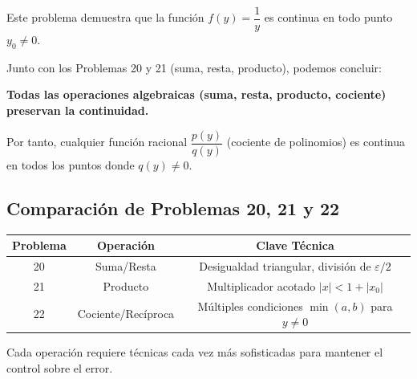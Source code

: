 Este problema demuestra que la función $f(y) = \dfrac{1}{y}$ es continua en todo punto $y_0 \neq 0$. 

Junto con los Problemas 20 y 21 (suma, resta, producto), podemos concluir:

\textbf{Todas las operaciones algebraicas (suma, resta, producto, cociente) preservan la continuidad.}

Por tanto, cualquier función racional $\dfrac{p(y)}{q(y)}$ (cociente de polinomios) es continua en todos los puntos donde $q(y) \neq 0$.

\subsection*{Comparación de Problemas 20, 21 y 22}

\begin{center}
\begin{tabular}{|c|c|c|}
\hline
\textbf{Problema} & \textbf{Operación} & \textbf{Clave Técnica} \\
\hline
20 & Suma/Resta & Desigualdad triangular, división de $\varepsilon/2$ \\
\hline
21 & Producto & Multiplicador acotado $|x| < 1 + |x_0|$ \\
\hline
22 & Cociente/Recíproca & Múltiples condiciones $\min(a,b)$ para $y \neq 0$ \\
\hline
\end{tabular}
\end{center}

Cada operación requiere técnicas cada vez más sofisticadas para mantener el control sobre el error.
